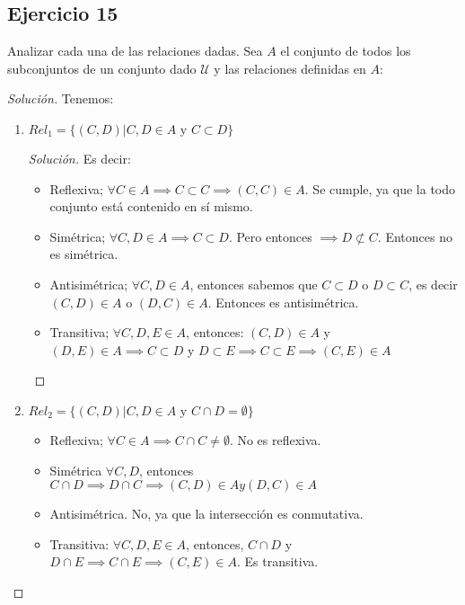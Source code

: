 \documentclass[a4paper,12pt]{article}
\newenvironment{solution}
  {\renewcommand\qedsymbol{$\blacksquare$}\begin{proof}[Solución]}
  {\end{proof}}
\begin{document}
\subsection{Ejercicio 15}
Analizar cada una de las relaciones dadas. Sea $A$ el conjunto de todos los subconjuntos de un conjunto dado $\mathcal{U}$ y las relaciones definidas en $A$: 
\begin{solution}
Tenemos:
\begin{enumerate}
    \item $Rel_1=\{(C,D)|C,D\in A \text{ y }C\subset D\}$
    \begin{solution}
    Es decir:
    \begin{itemize}
        \item Reflexiva; $\forall C\in A \implies C\subset C\implies (C, C)\in A$. Se cumple, ya que la todo conjunto está contenido en sí mismo.
        \item Simétrica; $\forall C,D \in A\implies C\subset D$. Pero entonces $\implies D\not\subset C$. Entonces no es simétrica.
        \item Antisimétrica; $\forall C,D \in A$, entonces sabemos que $C\subset D$ o $D\subset C$, es decir $(C,D)\in A$ o $(D,C)\in A$. Entonces es antisimétrica.
        \item Transitiva; $\forall C, D, E\in A$, entonces: $(C,D)\in A$ y $(D,E)\in A\implies C\subset D$ y $D\subset E\implies C\subset E\implies (C,E)\in A$
    \end{itemize}
    
    \end{solution}
    \item $Rel_2= \{(C,D)| C,D\in A\text{ y } C\cap D=\emptyset \}$
    \begin{itemize}
        \item Reflexiva; $\forall C \in A\implies C\cap C\not=\emptyset$. No es reflexiva.
        \item Simétrica $\forall C, D$, entonces $C\cap D\implies D\cap C\implies (C,D)\in A y (D,C)\in A$
        \item Antisimétrica. No, ya que la intersección es conmutativa. 
        \item Transitiva: $\forall C,D,E \in A$, entonces, $C\cap D$ y $D\cap E\implies C\cap E\implies (C,E)\in A$. Es transitiva.
    \end{itemize}
\end{enumerate}
\end{solution}
\end{document}
